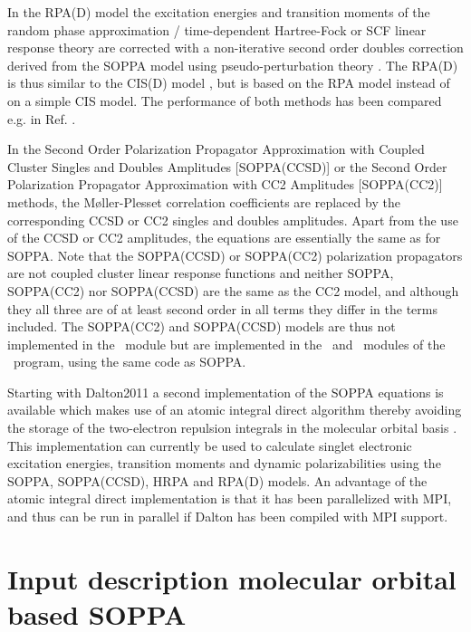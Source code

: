 In the RPA(D) model \cite{spas025} the excitation
energies and transition moments of the random phase approximation /
time-dependent Hartree-Fock or SCF linear response theory are corrected
with a non-iterative second order doubles correction derived from the
SOPPA model using pseudo-perturbation theory
\cite{Christiansen:PERTURBATIVE_TRIPLES}. The RPA(D) is thus similar to
the CIS(D) model \cite{Head-Gordon:94},
 but is based on the RPA model instead of on a simple CIS
model. The performance of both methods has been compared e.g. in Ref.
\cite{spas089}.

In the Second Order Polarization Propagator Approximation with Coupled
Cluster Singles and Doubles Amplitudes [SOPPA(CCSD)] \cite{soppaccsd,
ekdspasjpca102, tejospastcan100, ctocd, spas089}  or
the Second Order Polarization Propagator Approximation with CC2
Amplitudes [SOPPA(CC2)] \cite{spas097} methods, the
M{\o}ller-Plesset correlation coefficients are replaced by the
corresponding CCSD or CC2 singles and doubles amplitudes. Apart from
the use of the CCSD or CC2 amplitudes, the equations are essentially
the same as for SOPPA. Note that the SOPPA(CCSD) or SOPPA(CC2)
polarization propagators are not coupled cluster linear response
functions and neither SOPPA, SOPPA(CC2) nor SOPPA(CCSD) are the same as
the CC2 model, and although they all three are of at least second order
in all terms they differ in the terms included. The SOPPA(CC2) and
SOPPA(CCSD) models are thus not implemented in the \cc\ module but are
implemented in the \response\ and \abacus\ modules of the \dalton\ program,
using the same code as SOPPA.

Starting with Dalton2011 a second
implementation of the SOPPA equations is available which makes use of
an atomic integral direct algorithm thereby avoiding the storage of the
two-electron repulsion integrals in the molecular orbital basis
\cite{spas025, spas037, spas089}. This implementation can currently be
used to calculate singlet electronic excitation energies, transition 
moments and dynamic polarizabilities using the
SOPPA, SOPPA(CCSD), HRPA and RPA(D) models.
An advantage of the atomic integral direct implementation is that it has 
been parallelized with MPI, and thus can be run in parallel if Dalton has
been compiled with MPI support.


\section{Input description molecular orbital based SOPPA}\label{sec:soppainput}

